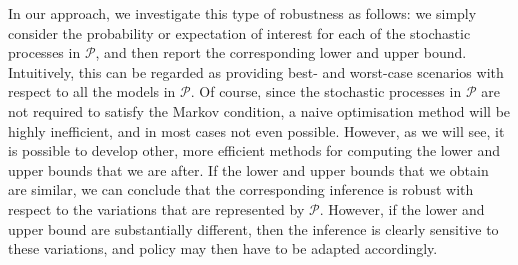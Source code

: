 \documentclass[10pt,a4paper]{paper}
\theoremstyle{definition}
\begin{document}
In our approach, we investigate this type of robustness as follows: we simply consider the probability or expectation of interest for each of the stochastic processes in $\mathcal{P}$, and then report the corresponding lower and upper bound. Intuitively, this can be regarded as providing best- and worst-case scenarios with respect to all the models in $\mathcal{P}$.
Of course, since the stochastic processes in $\mathcal{P}$ are not required to satisfy the Markov condition, a naive optimisation method will be highly inefficient, and in most cases not even possible. However, as we will see, it is possible to develop other, more efficient methods for computing the lower and upper bounds that we are after. If the lower and upper bounds that we obtain are similar, we can conclude that the corresponding inference is robust with respect to the variations that are represented by $\mathcal{P}$. However, if the lower and upper bound are substantially different, then the inference is clearly sensitive to these variations, and policy may then have to be adapted accordingly. 



\end{document}
